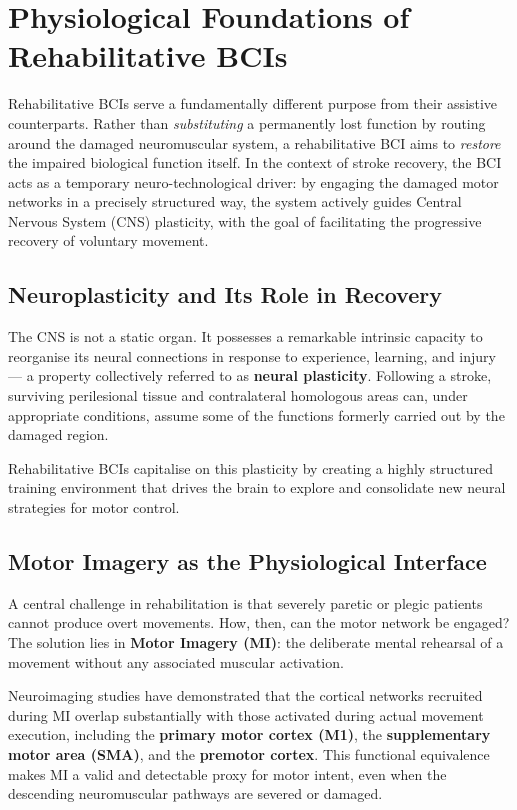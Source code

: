 \documentclass[10pt, letterpaper]{report}
\begin{document}
\section{Physiological Foundations of Rehabilitative BCIs}

Rehabilitative BCIs serve a fundamentally different purpose from their assistive
counterparts. Rather than \emph{substituting} a permanently lost function by routing around
the damaged neuromuscular system, a rehabilitative BCI aims to \emph{restore} the
impaired biological function itself. In the context of stroke recovery, the BCI acts as a
temporary neuro-technological driver: by engaging the damaged motor networks in a
precisely structured way, the system actively guides Central Nervous System (CNS)
plasticity, with the goal of facilitating the progressive recovery of voluntary movement.

\subsection{Neuroplasticity and Its Role in Recovery}

The CNS is not a static organ. It possesses a remarkable intrinsic capacity to reorganise
its neural connections in response to experience, learning, and injury — a property
collectively referred to as \textbf{neural plasticity}. Following a stroke, surviving perilesional
tissue and contralateral homologous areas can, under appropriate conditions, assume some
of the functions formerly carried out by the damaged region.

Rehabilitative BCIs capitalise on this plasticity by creating a highly structured training
environment that drives the brain to explore and consolidate new neural strategies for
motor control.

\subsection{Motor Imagery as the Physiological Interface}

A central challenge in rehabilitation is that severely paretic or plegic patients cannot
produce overt movements. How, then, can the motor network be engaged? The solution lies
in \textbf{Motor Imagery (MI)}: the deliberate mental rehearsal of a movement without any
associated muscular activation.

Neuroimaging studies have demonstrated that the cortical networks recruited during MI
overlap substantially with those activated during actual movement execution, including the
\textbf{primary motor cortex (M1)}, the \textbf{supplementary motor area (SMA)}, and the
\textbf{premotor cortex}. This functional equivalence makes MI a valid
and detectable proxy for motor intent, even when the descending neuromuscular pathways
are severed or damaged.
\end{document}
